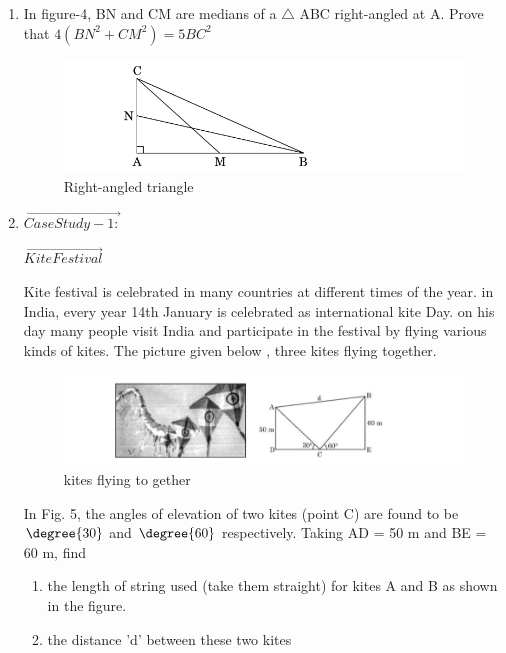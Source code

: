 \begin{enumerate}
\item In figure-4, BN and CM are medians of a $\triangle$ ABC right-angled at A. Prove that $4(BN^2 +CM^2) = 5BC^2$ 
\begin{figure}[!ht]
\centering
\includegraphics[width=\columnwidth]{figs/rightangled}
\caption{Right-angled triangle}
\label{fig:rightangled4}
\end{figure}
\item $\vec{Case Study - 1:}$
\begin{center}
$\vec{Kite Festival}$\\
\end{center}
Kite festival is celebrated in many countries at different times of the year. in India, every year 14th
January is celebrated as international kite Day. on his day many people visit India and participate in the festival by flying various kinds of kites.
The picture given below , three kites flying together.\\
\begin{figure}[!ht]
\centering
\includegraphics[width=\columnwidth]{figs/kites}
\caption{kites flying to gether}
\label{fig:kites5}
\end{figure}
In Fig. 5, the angles of elevation of two kites (point C) are found to be $\degree{30}$ and  $\degree{60}$ respectively. Taking AD = 50 m and BE = 60 m, find 
\begin{enumerate}
\item the length of string used (take them straight) for kites A and B as shown in the figure.
\item the distance 'd' between these two kites
\end{enumerate}
\end{enumerate}

